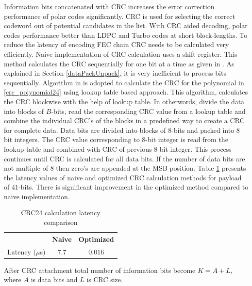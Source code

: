 Information bits concatenated with CRC increases the error correction performance of polar codes significantly. CRC is used for selecting the correct codeword out of potential candidates in the list. With CRC aided decoding, polar codes performance better than LDPC and Turbo codes at short block-lengths. To reduce the latency of encoding FEC chain CRC needs to be calculated very efficiently. Naive implementation of CRC calculation uses a shift register. This method calculates the CRC sequentially for one bit at a time as given in \cite{naiveCRCCalculation}. As explained in Section \ref{dataPackUnpack}, it is very inefficient to process bits sequentially. Algorithm in \cite{Sarwate:1988:CCR:63030.63037} is adopted to calculate the CRC for the polynomial in \eqref{crc_polynomial24} using lookup table based approach. This algorithm, calculates the CRC blockwise with the help of lookup table. In otherwords, divide the data into blocks of $B$-bits, read the corresponding CRC value from a lookup table and combine the individual CRC's of the blocks in a predefined way to create a CRC for complete data. Data bits are divided into blocks of 8-bits and packed into 8 bit integers. The CRC value corresponding to 8-bit integer is read from the lookup table and combined with CRC of previous 8-bit integer. This process continues until CRC is calculated for all data bits. If the number of data bits are not multiple of 8 then zero's are appended at the MSB position.  Table \ref{tab:crcLatencyTable} presents the latency values of naive and optimized  CRC calculation methods for payload of 41-bits. There is significant improvement in the optimized method compared to naive implementation.

\begin{table}[h!]
	\begin{center}
		\caption{CRC24 calculation latency comparison}
		\label{tab:crcLatencyTable}
		\begin{tabular}{c|c|c} %
			\textbf{ } & Naive & Optimized \\
			\hline
			Latency ($\mu$s) & $7.7$ & $0.016$\\
		\end{tabular}
	\end{center}
\end{table}

After CRC attachment total number of information bits become $K = A + L$, where $ A $ is data bits and $ L $ is CRC size.

